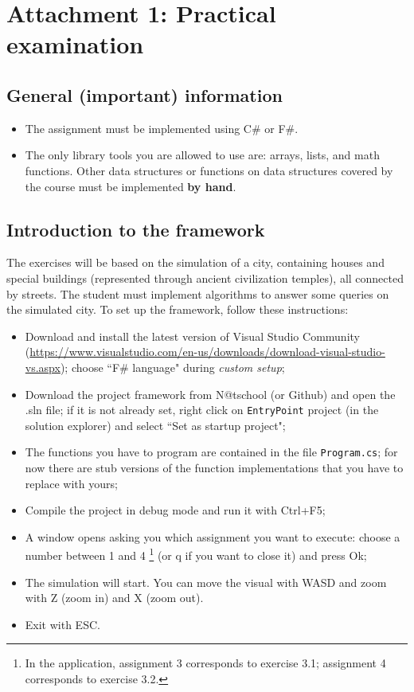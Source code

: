 \section*{Attachment 1: Practical examination}

\subsection*{General (important) information}
\begin{itemize}
\item The assignment must be implemented using C\# or F\#.
\item The only library tools you are allowed to use are: arrays, lists, and math functions. Other data structures or functions on data structures covered by the course must be implemented \textbf{by hand}.
\end{itemize}

\subsection*{Introduction to the framework}
The exercises will be based on the simulation of a city, containing houses and special buildings (represented through ancient civilization temples), all connected by streets. The student must implement algorithms to answer some queries on the simulated city.
To set up the framework, follow these instructions:

\begin{itemize}
\item Download and install the latest version of Visual Studio Community (\url{https://www.visualstudio.com/en-us/downloads/download-visual-studio-vs.aspx}); choose ``F\# language" during \textit{custom setup}; 
\item Download the project framework from N@tschool (or Github) and open the .sln file; if it is not already set, right click on \texttt{EntryPoint} project (in the solution explorer) and select ``Set as startup project";
\item The functions you have to program are contained in the file \texttt{Program.cs}; for now there are stub versions of the function implementations that you have to replace with yours;
\item Compile the project in debug mode and run it with Ctrl+F5;
\item A window opens asking you which assignment you want to execute: choose a number between 1 and 4 \footnote{In the application, assignment 3 corresponds to exercise 3.1; assignment 4 corresponds to exercise 3.2.} (or q if you want to close it) and press Ok;
\item The simulation will start. You can move the visual with WASD and zoom with Z (zoom in) and X (zoom out).
\item Exit with ESC. 
\end{itemize}

